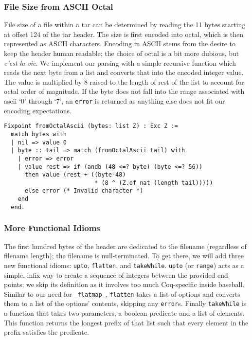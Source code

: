\documentclass[nocopyrightspace]{sigplanconf}
\begin{document}
\subsubsection{File Size from ASCII Octal}
File size of a file within a tar can be determined by reading the 11 bytes
starting at offset 124 of the tar header. The size is first encoded into
octal, which is then represented as ASCII characters. Encoding in ASCII stems
from the desire to keep the header human readable; the choice of octal is a
bit more dubious, but {\it c'est la vie}. We implement our parsing with a
simple recursive function which reads the next byte from a list and converts
that into the encoded integer value. The value is multiplied by 8 raised to
the length of rest of the list to account for octal order of magnitude. If the
byte does not fall into the range associated with ascii `0' through `7', an
{\tt error} is returned as anything else does not fit our encoding
expectations.

\begin{lstlisting}
Fixpoint fromOctalAscii (bytes: list Z) : Exc Z :=
  match bytes with
  | nil => value 0
  | byte :: tail => match (fromOctalAscii tail) with
    | error => error
    | value rest => if (andb (48 <=? byte) (byte <=? 56))
      then value (rest + ((byte-48)
                          * (8 ^ (Z.of_nat (length tail)))))
      else error (* Invalid character *)
    end
  end.
\end{lstlisting}

\subsubsection{More Functional Idioms}

The first hundred bytes of the header are dedicated to the filename
(regardless of filename length); the filename is null-terminated. To get
there, we will add three new functional idioms: {\tt upto}, {\tt flatten}, and
{\tt takeWhile}. {\tt upto} (or {\tt range}) acts as a simple, infix way to
create a sequence of integers between the provided end points; we skip its
definition as it involves too much Coq-specific inside baseball. Similar to
our need for {\tt \_flatmap\_}, {\tt flatten} takes a list of options and
converts them to a list of the options' contents, skipping any {\tt error}s.
Finally {\tt takeWhile} is a function that takes two parameters, a boolean
predicate and a list of elements. This function returns the longest prefix of
that list such that every element in the prefix satisfies the predicate.
\end{document}
